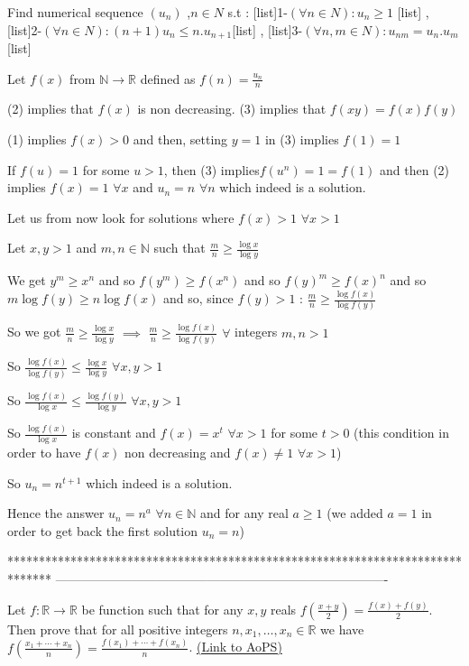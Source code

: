 \begin{solution}
	\begin{tcolorbox}Find numerical sequence $(u_{n})$ ,$n\in N$ s.t : [list]1-$(\forall n\in N): u_{n}\geq{1}$ [\/list] , [list]2-$(\forall n\in N): (n+1)u_{n}\leq{n.u_{n+1}}$[\/list] , [list]3-$(\forall n,m\in N):u_{nm}=u_{n}.u_{m}$[\/list]\end{tcolorbox}
Let $f(x)$ from $\mathbb N\to\mathbb R$ defined as $f(n)=\frac{u_n}n$

(2) implies that $f(x)$ is non decreasing.
(3) implies that $f(xy)=f(x)f(y)$

(1) implies $f(x)>0$ and then, setting $y=1$ in (3) implies $f(1)=1$

If $f(u)=1$ for some $u>1$, then (3) implies$ f(u^n)=1=f(1)$ and then (2) implies $f(x)=1$ $\forall x$ and $u_n=n$ $\forall n$ which indeed is a solution.

Let us from now look for solutions where $f(x)>1$ $\forall x>1$ 

Let $x,y> 1$ and $m,n\in\mathbb N$ such that $\frac mn\ge \frac{\log x}{\log y}$

We get $y^m\ge x^n$ and so $f(y^m)\ge f(x^n)$ and so $f(y)^m\ge f(x)^n$ and so $m\log f(y)\ge n\log f(x)$ and so, since $f(y)>1$ : $\frac mn\ge \frac{\log f(x)}{\log f(y)}$

So we got $\frac mn\ge \frac{\log x}{\log y}$ $\implies$ $\frac mn\ge \frac{\log f(x)}{\log f(y)}$ $\forall$ integers $m,n>1$

So $\frac{\log f(x)}{\log f(y)}\le \frac{\log x}{\log y}$ $\forall x,y>1$

So $\frac{\log f(x)}{\log x}\le \frac{\log f(y)}{\log y}$ $\forall x,y>1$

So $\frac{\log f(x)}{\log x}$ is constant and $f(x)=x^t$ $\forall x>1$ for some $t>0$ (this condition in order to have $f(x)$ non decreasing and $f(x)\ne 1$ $\forall x>1$)

So $u_n=n^{t+1}$ which indeed is a solution.

Hence the answer $\boxed{u_n=n^a}$ $\forall n\in\mathbb N$ and for any real $a\ge 1$ (we added $a=1$ in order to get back the first solution $u_n=n$)
\end{solution}
*******************************************************************************
-------------------------------------------------------------------------------

\begin{problem}
	Let $f:\mathbb{R} \rightarrow \mathbb{R}$ be function such that for any $x,y$ reals $f\left (\frac{x+y}{2}\right )=\frac{f(x)+f(y)}{2}$. Then prove that for all positive integers  $n , x_1 , \ldots , x_n \in \mathbb{R}$ we have
$f\left (\frac{x_1+\cdots+x_n}{n}\right )=\frac{f(x_1)+\cdots+f(x_n)}{n}$.
	\flushright \href{https://artofproblemsolving.com/community/c6h480877}{(Link to AoPS)}
\end{problem}



